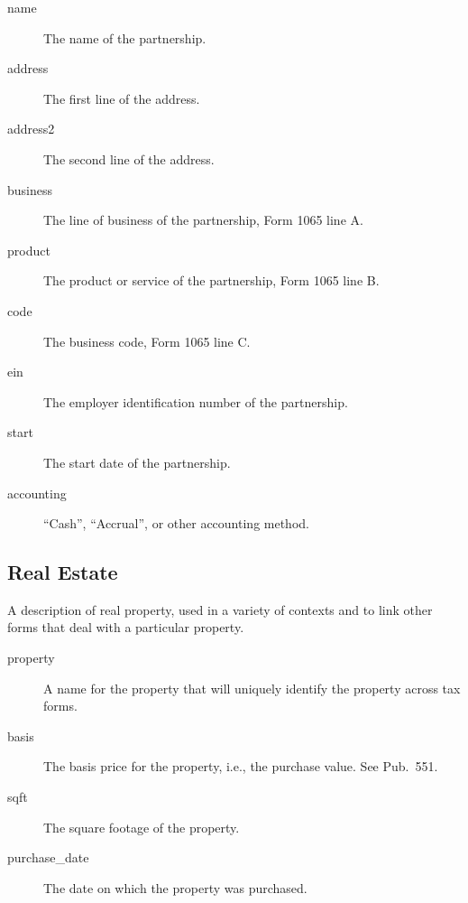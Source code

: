 \documentclass[12pt]{article}
\begin{document}
\begin{description}
\item[name] The name of the partnership.
\item[address] The first line of the address.
\item[address2] The second line of the address.
\item[business] The line of business of the partnership, Form 1065 line A.
\item[product] The product or service of the partnership, Form 1065 line B.
\item[code] The business code, Form 1065 line C.
\item[ein] The employer identification number of the partnership.
\item[start] The start date of the partnership.
\item[accounting] ``Cash'', ``Accrual'', or other accounting method.
\end{description}

\subsection{Real Estate}

A description of real property, used in a variety of contexts and to link other
forms that deal with a particular property.

\begin{description}
\item[property] A name for the property that will uniquely identify the property
across tax forms.
\item[basis] The basis price for the property, i.e., the purchase value. See
Pub.\ 551.
\item[sqft] The square footage of the property.
\item[purchase\_date] The date on which the property was purchased.
\end{description}
\end{document}
